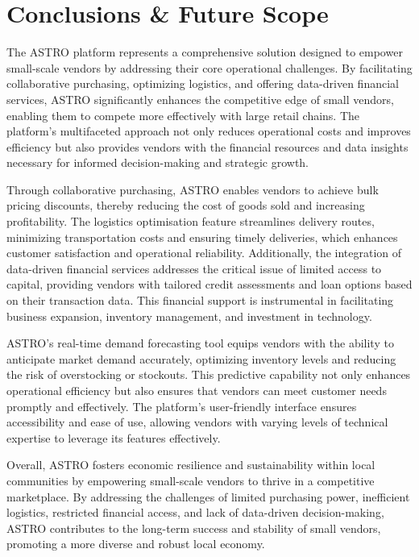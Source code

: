 \chapter{Conclusions \& Future Scope}

The ASTRO platform represents a comprehensive solution designed to empower small-scale vendors by addressing their core operational challenges. By facilitating collaborative purchasing, optimizing logistics, and offering data-driven financial services, ASTRO significantly enhances the competitive edge of small vendors, enabling them to compete more effectively with large retail chains. The platform’s multifaceted approach not only reduces operational costs and improves efficiency but also provides vendors with the financial resources and data insights necessary for informed decision-making and strategic growth.

Through collaborative purchasing, ASTRO enables vendors to achieve bulk pricing discounts, thereby reducing the cost of goods sold and increasing profitability. The logistics optimisation feature streamlines delivery routes, minimizing transportation costs and ensuring timely deliveries, which enhances customer satisfaction and operational reliability. Additionally, the integration of data-driven financial services addresses the critical issue of limited access to capital, providing vendors with tailored credit assessments and loan options based on their transaction data. This financial support is instrumental in facilitating business expansion, inventory management, and investment in technology.

ASTRO’s real-time demand forecasting tool equips vendors with the ability to anticipate market demand accurately, optimizing inventory levels and reducing the risk of overstocking or stockouts. This predictive capability not only enhances operational efficiency but also ensures that vendors can meet customer needs promptly and effectively. The platform’s user-friendly interface ensures accessibility and ease of use, allowing vendors with varying levels of technical expertise to leverage its features effectively.

Overall, ASTRO fosters economic resilience and sustainability within local communities by empowering small-scale vendors to thrive in a competitive marketplace. By addressing the challenges of limited purchasing power, inefficient logistics, restricted financial access, and lack of data-driven decision-making, ASTRO contributes to the long-term success and stability of small vendors, promoting a more diverse and robust local economy.

